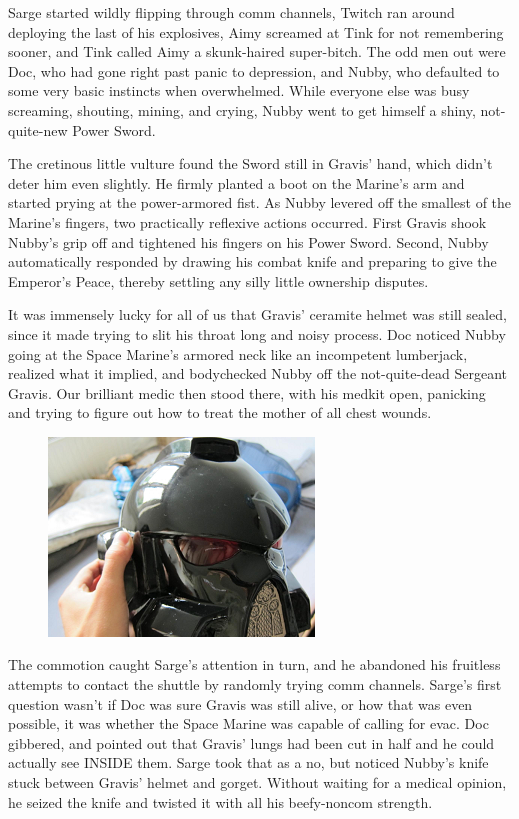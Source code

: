 Sarge started wildly flipping through comm channels, Twitch ran around deploying the last of his explosives, Aimy screamed at Tink for not remembering sooner, and Tink called Aimy a skunk-haired super-bitch. 
The odd men out were Doc, who had gone right past panic to depression, and Nubby, who defaulted to some very basic instincts when overwhelmed. 
While everyone else was busy screaming, shouting, mining, and crying, Nubby went to get himself a shiny, not-quite-new Power Sword.

The cretinous little vulture found the Sword still in Gravis' hand, which didn't deter him even slightly. 
He firmly planted a boot on the Marine's arm and started prying at the power-armored fist. 
As Nubby levered off the smallest of the Marine's fingers, two practically reflexive actions occurred. 
First Gravis shook Nubby's grip off and tightened his fingers on his Power Sword. 
Second, Nubby automatically responded by drawing his combat knife and preparing to give the Emperor's Peace, thereby settling any silly little ownership disputes. 


It was immensely lucky for all of us that Gravis' ceramite helmet was still sealed, since it made trying to slit his throat long and noisy process. 
Doc noticed Nubby going at the Space Marine's armored neck like an incompetent lumberjack, realized what it implied, and bodychecked Nubby off the not-quite-dead Sergeant Gravis. 
Our brilliant medic then stood there, with his medkit open, panicking and trying to figure out how to treat the mother of all chest wounds.
\begin{figure}
	\begin{center}
		\includegraphics[width=\figwidth]{pics/12/54.png}
	\end{center}
\end{figure}
The commotion caught Sarge's attention in turn, and he abandoned his fruitless attempts to contact the shuttle by randomly trying comm channels. 
Sarge's first question wasn't if Doc was sure Gravis was still alive, or how that was even possible, it was whether the Space Marine was capable of calling for evac. 
Doc gibbered, and pointed out that Gravis' lungs had been cut in half and he could actually see INSIDE them. 
Sarge took that as a no, but noticed Nubby's knife stuck between Gravis' helmet and gorget. 
Without waiting for a medical opinion, he seized the knife and twisted it with all his beefy-noncom strength. 


